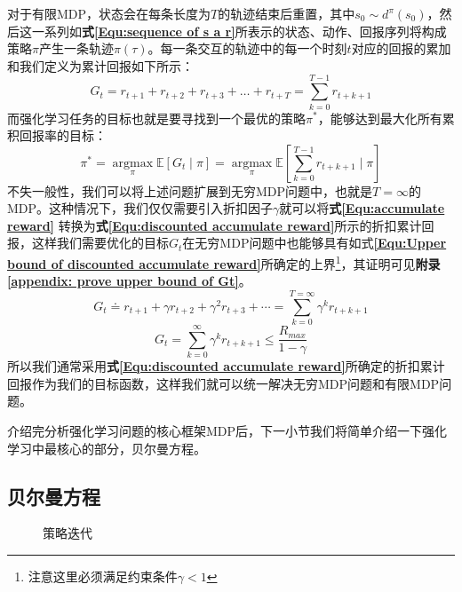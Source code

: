 对于有限MDP，状态会在每条长度为$T$的轨迹结束后重置，其中$s_0\sim d^\pi(s_0)$，然后这一系列如\textbf{式\eqref{Equ:sequence of s a r}}所表示的状态、动作、回报序列将构成策略$\pi$产生一条轨迹$\pi(\tau)$。每一条交互的轨迹中的每一个时刻$t$对应的回报的累加和我们定义为累计回报如下所示：
\begin{equation}
    \label{Equ:accumulate reward}
    G_t=r_{t+1} + r_{t+2} + r_{t+3} + \dots + r_{t+T} =\sum_{k=0}^{T-1}  r_{t+k+1}
\end{equation}
而强化学习任务的目标也就是要寻找到一个最优的策略$\pi^*$，能够达到最大化所有累积回报率的目标：
\begin{equation}
    \pi^{*}=\underset{\pi}{\operatorname{argmax}} \mathbb{E}[G_t \mid \pi]=\underset{\pi}{\operatorname{argmax}} \mathbb{E}[\sum_{k=0}^{T-1}  r_{t+k+1} \mid \pi]
\end{equation}
不失一般性，我们可以将上述问题扩展到无穷MDP问题中，也就是$T=\infty$的MDP。这种情况下，我们仅仅需要引入折扣因子$\gamma$就可以将\textbf{式\eqref{Equ:accumulate reward}} 转换为\textbf{式\eqref{Equ:discounted accumulate reward}}所示的折扣累计回报，这样我们需要优化的目标$G_t$在无穷MDP问题中也能够具有如式\textbf{\eqref{Equ:Upper bound of discounted accumulate reward}}所确定的上界\footnote{注意这里必须满足约束条件$\gamma<1$}，其证明可见\textbf{附录\ref{appendix: prove upper bound of Gt}}。
\begin{equation}
\label{Equ:discounted accumulate reward}
G_{t} \doteq r_{t+1}+\gamma r_{t+2}+\gamma^{2} r_{t+3}+\cdots=\sum_{k=0}^{T=\infty} \gamma^{k} r_{t+k+1}
\end{equation}
\begin{equation}
\label{Equ:Upper bound of discounted accumulate reward}
G_{t} =\sum_{k=0}^{\infty} \gamma^{k} r_{t+k+1} \leq \frac{R_{max}}{1-\gamma}
\end{equation}
所以我们通常采用\textbf{式\eqref{Equ:discounted accumulate reward}}所确定的折扣累计回报作为我们的目标函数，这样我们就可以统一解决无穷MDP问题和有限MDP问题。

介绍完分析强化学习问题的核心框架MDP后，下一小节我们将简单介绍一下强化学习中最核心的部分，贝尔曼方程。
\subsection{贝尔曼方程}
\begin{figure}[!t]
	\centering
	\caption{策略迭代}
	\label{Fig:Policy iterator}
\end{figure}



